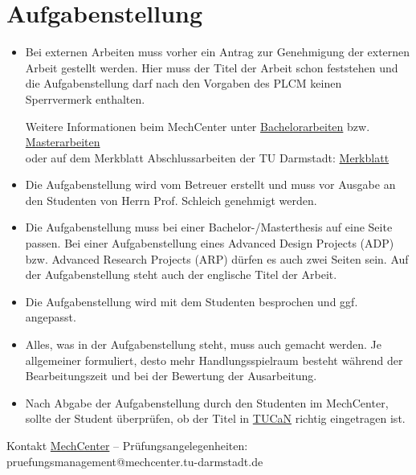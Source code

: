 \section{Aufgabenstellung}
\begin{sloppypar}
\begin{itemize}
    \item Bei externen Arbeiten muss vorher ein Antrag zur Genehmigung der externen Arbeit gestellt werden. Hier muss der Titel der Arbeit schon feststehen und die Aufgabenstellung darf nach den Vorgaben des PLCM keinen Sperrvermerk enthalten.

    Weitere Informationen beim MechCenter unter \href{https://www.maschinenbau.tu-darmstadt.de/studieren/studierende/studium_bachelor/abschlussarbeiten_bachelor/index.de.jsp}{Bachelorarbeiten}  bzw. \href{https://www.maschinenbau.tu-darmstadt.de/studieren/studierende/studium_master/abschlussarbeit/index.de.jsp}{Masterarbeiten} \\
    oder auf dem Merkblatt Abschlussarbeiten der TU Darmstadt:
    \href{https://www.tu-darmstadt.de/media/dezernat_ii/referat_iig/fuer_pruefende/merkblaetter/info_externe_abschlussarbeiten.pdf}{Merkblatt}

    \item Die Aufgabenstellung wird vom Betreuer erstellt und muss vor Ausgabe an den Studenten von Herrn Prof. Schleich genehmigt werden. 

    \item Die Aufgabenstellung muss bei einer Bachelor-/Masterthesis auf eine Seite passen. Bei einer Aufgabenstellung eines Advanced Design Projects (ADP) bzw. Advanced Research Projects (ARP) dürfen es auch zwei Seiten sein. Auf der Aufgabenstellung steht auch der englische Titel der Arbeit. 

    \item Die Aufgabenstellung wird mit dem Studenten besprochen und ggf. angepasst. 

    \item Alles, was in der Aufgabenstellung steht, muss auch gemacht werden. Je allgemeiner formuliert, desto mehr Handlungsspielraum besteht während der Bearbeitungszeit und bei der Bewertung der Ausarbeitung.


    \item Nach Abgabe der Aufgabenstellung durch den Studenten im MechCenter, sollte der Student überprüfen, ob der Titel in \href{https://www.tucan.tu-darmstadt.de}{TUCaN} richtig eingetragen ist. 

\end{itemize}

Kontakt \href{https://www.maschinenbau.tu-darmstadt.de/studieren/mechcenter_studienbuero/pruefungsangelegenheiten/index.de.jsp}{MechCenter} -- Prüfungsangelegenheiten:\\ pruefungsmanagement@mechcenter.tu-darmstadt.de 

\end{sloppypar}


